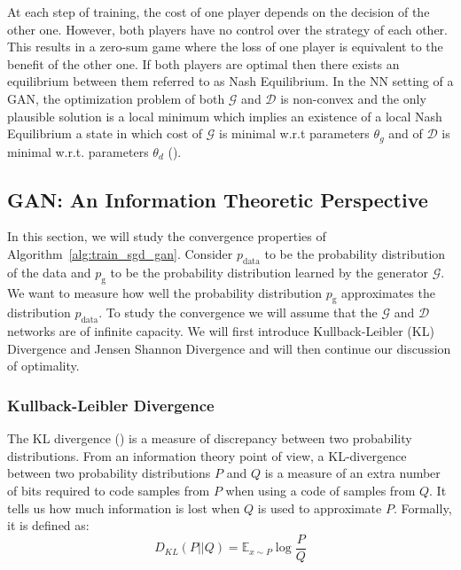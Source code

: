 At each step of training, the cost of one player depends on the decision of the other one. However, both players have no control over the strategy of each other. This results in a zero-sum game where the loss of one player is equivalent to the benefit of the other one. If both players are optimal then there exists an equilibrium between them referred to as Nash Equilibrium. In the NN setting of a GAN, the optimization problem of both $\mathcal{G}$ and $\mathcal{D}$ is non-convex and the only plausible solution is a local minimum which implies an existence of a local Nash Equilibrium a state in which cost of $\mathcal{G}$ is minimal w.r.t parameters $\theta_g$ and of $\mathcal{D}$ is minimal w.r.t. parameters $\theta_d$ (\cite{ratliff2013characterization}).

\subsection{GAN: An Information Theoretic Perspective}
\label{subsec:gan_itp}
In this section, we will study the convergence properties of Algorithm~\ref{alg:train_sgd_gan}. Consider $p_\text{data}$ to be the probability distribution of the data and $p_\text{g}$ to be the probability distribution learned by the generator $\mathcal{G}$. We want to measure how well the probability distribution $p_\text{g}$ approximates the distribution $p_\text{data}$. To study the convergence we will assume that the $\mathcal{G}$ and $\mathcal{D}$ networks are of infinite capacity. We will first introduce Kullback-Leibler (KL) Divergence and Jensen Shannon Divergence and will then continue our discussion of optimality.

\subsubsection{Kullback-Leibler Divergence}
\label{subsec:kld}
The KL
divergence (\cite{kullback1951information}) is a measure of discrepancy between two probability distributions. From an information theory point of view, a KL-divergence between two probability distributions $P$ and $Q$ is a measure of an extra number of bits required to code samples from $P$ when using a code of samples from $Q$. It tells us how much information is lost when $Q$ is used to approximate $P$. Formally, it is defined as:
\begin{equation}
    \label{eq:kld}
    D_{KL} (P || Q) = \mathbb{E}_{x\sim P} \log \frac{P}{Q}
\end{equation}

